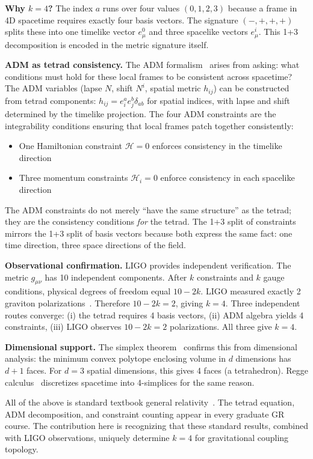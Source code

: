 \documentclass[aps,prd,preprint,superscriptaddress,showpacs,preprintnumbers,amsmath,amssymb,nofootinbib]{revtex4-2}
\begin{document}
\textbf{Why $k=4$?} The index $a$ runs over four values $(0, 1, 2, 3)$ because a frame in 4D spacetime requires exactly four basis vectors. The signature $(-,+,+,+)$ splits these into one timelike vector $e^0_\mu$ and three spacelike vectors $e^i_\mu$. This 1+3 decomposition is encoded in the metric signature itself.

\textbf{ADM as tetrad consistency.} The ADM formalism~\cite{adm1962} arises from asking: what conditions must hold for these local frames to be consistent across spacetime? The ADM variables (lapse $N$, shift $N^i$, spatial metric $h_{ij}$) can be constructed from tetrad components: $h_{ij} = e^a_i e^b_j \delta_{ab}$ for spatial indices, with lapse and shift determined by the timelike projection. The four ADM constraints are the integrability conditions ensuring that local frames patch together consistently:
\begin{itemize}
\item One Hamiltonian constraint $\mathcal{H} = 0$ enforces consistency in the timelike direction
\item Three momentum constraints $\mathcal{H}_i = 0$ enforce consistency in each spacelike direction
\end{itemize}
The ADM constraints do not merely ``have the same structure'' as the tetrad; they are the consistency conditions \emph{for} the tetrad. The 1+3 split of constraints mirrors the 1+3 split of basis vectors because both express the same fact: one time direction, three space directions of the field.

\textbf{Observational confirmation.} LIGO provides independent verification. The metric $g_{\mu\nu}$ has 10 independent components. After $k$ constraints and $k$ gauge conditions, physical degrees of freedom equal $10 - 2k$. LIGO measured exactly 2 graviton polarizations~\cite{gw170817}. Therefore $10 - 2k = 2$, giving $k = 4$. Three independent routes converge: (i) the tetrad requires 4 basis vectors, (ii) ADM algebra yields 4 constraints, (iii) LIGO observes $10 - 2k = 2$ polarizations. All three give $k = 4$.

\textbf{Dimensional support.} The simplex theorem~\cite{ziegler1995} confirms this from dimensional analysis: the minimum convex polytope enclosing volume in $d$ dimensions has $d+1$ faces. For $d=3$ spatial dimensions, this gives 4 faces (a tetrahedron). Regge calculus~\cite{regge1961} discretizes spacetime into 4-simplices for the same reason.

All of the above is standard textbook general relativity~\cite{mtw1973,wald1984}. The tetrad equation, ADM decomposition, and constraint counting appear in every graduate GR course. The contribution here is recognizing that these standard results, combined with LIGO observations, uniquely determine $k=4$ for gravitational coupling topology.
\end{document}
